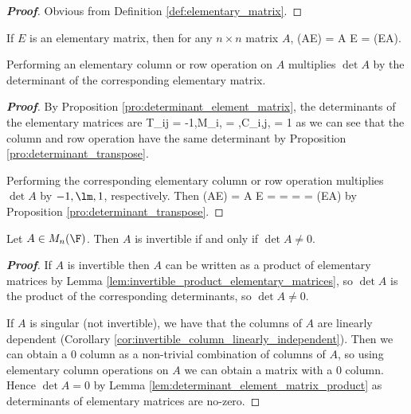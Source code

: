 \begin{proof}[\bf Proof]
Obvious from Definition \ref{def:elementary_matrix}.
\end{proof}


\begin{lemma}\label{lem:determinant_element_matrix_product}
If $E$ is an elementary matrix, then for any $n \times n$ matrix $A$,
\be
\det(AE) = \det A \det E = \det(EA).
\ee

Performing an elementary column or row operation on $A$ multiplies $\det A$ by the determinant of the corresponding elementary matrix.
\end{lemma}

\begin{proof}[\bf Proof]
By Proposition \ref{pro:determinant_element_matrix}, the determinants of the elementary matrices are %
\be
\det T_{ij} =  -1,\quad \det M_{i,\lm} = \lm,\quad \det C_{i,j,\lm} = 1
\ee
as we can see that the column and row operation have the same determinant by Proposition \ref{pro:determinant_transpose}.

Performing the corresponding elementary column or row operation multiplies $\det A$ by $-1, \lm, 1$, respectively. Then
\be
\det (AE) = \det A \det E = \det {} \det {} = \det {} = \det{} = \det(EA)
\ee
by Proposition \ref{pro:determinant_transpose}.
\end{proof}

\begin{theorem}\label{thm:matrix_invertible_determinant_non_zero}
Let $A\in M_n(\F)$. Then $A$ is invertible if and only if $\det A \neq 0$.
\end{theorem}

\begin{proof}[\bf Proof]
If $A$ is invertible then $A$ can be written as a product of elementary matrices by Lemma \ref{lem:invertible_product_elementary_matrices}, so $\det A$ is the product of the corresponding determinants, so $\det A \neq 0$.

If $A$ is singular (not invertible), we have that the columns of $A$ are linearly dependent (Corollary \ref{cor:invertible_column_linearly_independent}). Then we can obtain a 0 column as a non-trivial combination of columns of $A$, so using elementary column operations on $A$ we can obtain a matrix with a 0 column. Hence $\det A = 0$ by Lemma \ref{lem:determinant_element_matrix_product} as determinants of elementary matrices are no-zero.
\end{proof}


